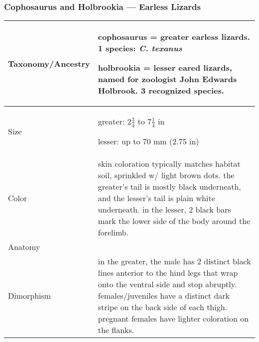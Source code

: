 \subsubsection{Cophosaurus and Holbrookia --- Earless Lizards}
\begin{center}
\begin{longtabu} to 

	\hline
	Taxonomy/Ancestry &
	cophosaurus = greater earless lizards. 1 species: \emph{C. texanus}
	
	holbrookia = lesser eared lizards, named for zoologist John Edwards Holbrook. 3 recognized species.
	 \\
	\hline
	Size & 
	greater: $2 \frac{3}{4}$ to $7 \frac{1}{4}$ in
	
	lesser: up to 70 mm (2.75 in)
	\\
	\hline
	Color &
	skin coloration typically matches habitat soil, sprinkled w/ light brown dots. the greater's tail is mostly black underneath, and the lesser's tail is plain white underneath. in the lesser, 2 black bars mark the lower side of the body around the forelimb.
	 \\
	\hline
	Anatomy &
	
	 \\
	\hline
	Dimorphism & 
	in the greater, the male has 2 distinct black lines anterior to the hind legs that wrap onto the ventral side and stop abruptly. females/juveniles have a distinct dark stripe on the back side of each thigh. pregnant females have lighter coloration on the flanks. 
	

\end{longtabu}
\end{center}

